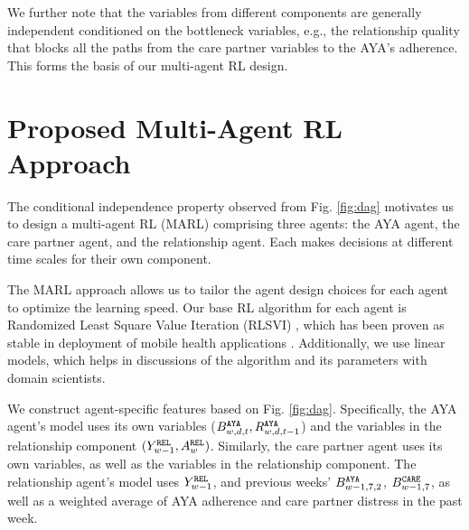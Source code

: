 We further note that the variables from different components are generally independent conditioned on the bottleneck variables, e.g., the relationship quality that blocks all the paths from the care partner variables to the AYA's adherence. This forms the basis of our multi-agent RL design.




\section{Proposed Multi-Agent RL Approach}

The conditional independence property observed from Fig. \ref{fig:dag} motivates us to design a multi-agent RL (MARL) comprising three agents: the AYA agent, the care partner agent, and the relationship agent. Each makes decisions at different time scales for their own component.


The MARL approach allows us to tailor the agent design choices for each agent to optimize the learning speed. Our base RL algorithm for each agent is Randomized Least Square Value Iteration (RLSVI) \cite{osband2016generalization}, which has been proven as stable in deployment of mobile health applications \cite{trella2024deployed,ghosh2024miwaves}. Additionally, we use linear models, which helps in discussions of the algorithm and its parameters with domain scientists. 

We construct agent-specific features based on Fig. \ref{fig:dag}. Specifically, the AYA agent's model uses its own variables ($B_{w, d, t}^{\tiny\texttt{AYA}}, R_{w, d, t-1}^{\tiny\texttt{AYA}}$) and the variables in the relationship component $(Y_{w-1}^{\tiny\texttt{REL}}, A_{w}^{\tiny\texttt{REL}})$. Similarly, the care partner agent uses its own variables, as well as the variables in the relationship component. The relationship agent's model uses $Y_{w-1}^{\tiny\texttt{REL}}$, and previous weeks' $B_{w-1, 7, 2}^{\tiny\texttt{AYA}}$, $B_{w-1, 7}^{\tiny\texttt{CARE}}$, as well as a weighted average of AYA adherence and care partner distress in the past week.

